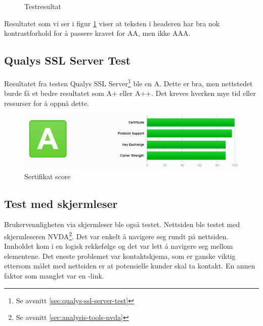 \begin{figure}[H]
    \begin{center}

        \caption{Testresultat}
        \label{fig:analysis-current-a11y_bg-h1_p}
    \end{center}
\end{figure}

Resultatet som vi ser i figur \ref{fig:analysis-current-a11y_bg-h1_p} viser at teksten i headeren har bra nok kontrastforhold for å passere kravet for AA, men ikke AAA. 

\subsection{Qualys SSL Server Test}
Resultatet fra testen Qualys SSL Server\footnote{Se avsnitt \ref{sec:qualys-ssl-server-test}} ble en A. Dette er bra, men nettstedet burde få et bedre resultatet som A+ eller A++. Det kreves hverken mye tid eller ressurser for å oppnå dette.

\begin{figure}[H]
    \centering
    \includegraphics[width=\textwidth]{bjornar/ssllabs.png}
    \caption{Sertifikat score}
    \label{fig:analysis-current-ssl}
\end{figure}

\subsection{Test med skjermleser}
Brukervennligheten via skjermleser ble også testet. Nettsiden ble testet med skjermleseren NVDA\footnote{Se avsnitt \ref{sec:analysis-tools-nvda}}. Det var enkelt å navigere seg rundt på nettsiden. Innholdet kom i en logisk rekkefølge og det var lett å navigere seg mellom elementene. Det eneste problemet var kontaktskjema, som er ganske viktig ettersom målet med nettsiden er at potensielle kunder skal ta kontakt. En annen faktor som manglet var en -link.

